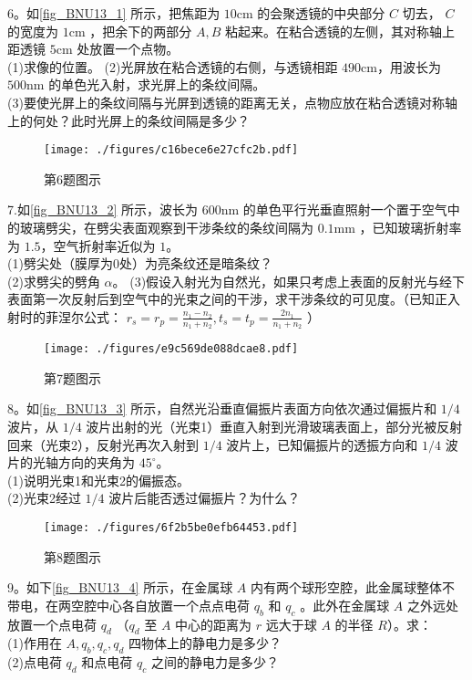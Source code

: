 6。如\autoref{fig_BNU13_1} 所示，把焦距为 $10\mathrm{cm}$ 的会聚透镜的中央部分 $C$ 切去， $C$ 的宽度为 $1\mathrm{cm}$ ，把余下的两部分 $A,B$ 粘起来。在粘合透镜的左侧，其对称轴上距透镜 $5\mathrm{cm}$ 处放置一个点物。\\
(1)求像的位置。
(2)光屏放在粘合透镜的右侧，与透镜相距 $490\mathrm{cm}$，用波长为 $500\mathrm{nm}$ 的单色光入射，求光屏上的条纹间隔。\\
(3)要使光屏上的条纹间隔与光屏到透镜的距离无关，点物应放在粘合透镜对称轴上的何处？此时光屏上的条纹间隔是多少？
\begin{figure}[ht]
\centering
\texttt{[image: ./figures/c16bece6e27cfc2b.pdf]}
\caption{第6题图示} \label{fig_BNU13_1}
\end{figure}
7.如\autoref{fig_BNU13_2} 所示，波长为 $600\mathrm{nm}$ 的单色平行光垂直照射一个置于空气中的玻璃劈尖，在劈尖表面观察到干涉条纹的条纹间隔为 $0.1\mathrm{mm}$ ，已知玻璃折射率为 $1.5$，空气折射率近似为 $1$。\\
(1)劈尖处（膜厚为0处）为亮条纹还是暗条纹？\\
(2)求劈尖的劈角 $\alpha$。
(3)假设入射光为自然光，如果只考虑上表面的反射光与经下表面第一次反射后到空气中的光束之间的干涉，求干涉条纹的可见度。（已知正入射时的菲涅尔公式： $r_s=r_p=\frac{n_1-n_2}{n_1+n_2},t_s=t_p=\frac{2n_1}{n_1+n_2}$ ）
\begin{figure}[ht]
\centering
\texttt{[image: ./figures/e9c569de088dcae8.pdf]}
\caption{第7题图示} \label{fig_BNU13_2}
\end{figure}
8。如\autoref{fig_BNU13_3} 所示，自然光沿垂直偏振片表面方向依次通过偏振片和 $1/4$ 波片，从 $1/4$ 波片出射的光（光束1）垂直入射到光滑玻璃表面上，部分光被反射回来（光束2），反射光再次入射到 $1/4$ 波片上，已知偏振片的透振方向和 $1/4$ 波片的光轴方向的夹角为 $45^\circ$。\\
(1)说明光束1和光束2的偏振态。\\
(2)光束2经过 $1/4$ 波片后能否透过偏振片？为什么？
\begin{figure}[ht]
\centering
\texttt{[image: ./figures/6f2b5be0efb64453.pdf]}
\caption{第8题图示} \label{fig_BNU13_3}
\end{figure}
9。如下\autoref{fig_BNU13_4} 所示，在金属球 $A$ 内有两个球形空腔，此金属球整体不带电，在两空腔中心各自放置一个点点电荷 $q_b$ 和 $q_c$ 。此外在金属球 $A$ 之外远处放置一个点电荷 $q_d$ （$q_d$ 至 $A$ 中心的距离为 $r$ 远大于球 $A$ 的半径 $R$）。求：\\
(1)作用在 $A,q_b,q_c,q_d$ 四物体上的静电力是多少？\\
(2)点电荷 $q_d$ 和点电荷 $q_c$ 之间的静电力是多少？\\
